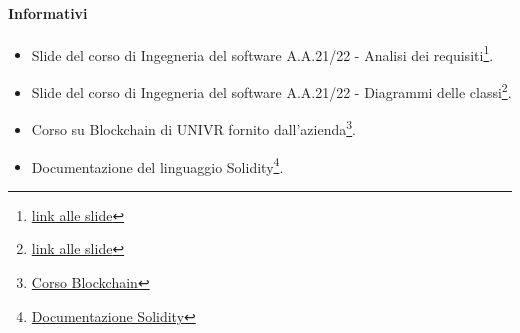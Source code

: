 \paragraph{Informativi}
\begin{itemize}
    \item Slide del corso di Ingegneria del software A.A.21/22 - Analisi dei requisiti\footnote{\href{}{link alle slide}}.
    \item Slide del corso di Ingegneria del software A.A.21/22 - Diagrammi delle classi\footnote{\href{}{link alle slide}}.
    \item Corso su Blockchain di UNIVR fornito dall'azienda\footnote{\href{https://univr.cloud.panopto.eu/Panopto/Pages/Sessions/List.aspx?folderID=1c8bb888-fca4-48bd-85af-acc700e40484 }{Corso Blockchain}}.
    \item Documentazione del linguaggio Solidity\glo \footnote{\href{https://docs.soliditylang.org/en/v0.7.4/introduction-to-smart-contracts.html}{Documentazione Solidity}}.
\end{itemize}

\clearpage


